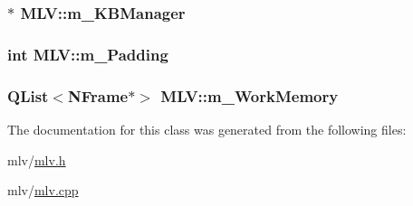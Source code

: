 \label{class_m_l_v_a735f5f98d1dcf3b835bfce6bb095334f}
\hypertarget{class_m_l_v_a658f6c57497493ea3002372ec8c1e87e}{
\subsubsection[{m\_\-KBManager}]{$\ast$ {\bf MLV::m\_\-KBManager}}}
\label{class_m_l_v_a658f6c57497493ea3002372ec8c1e87e}
\hypertarget{class_m_l_v_a5a16ccfba23723ec1006b15e8b2340ea}{
\subsubsection[{m\_\-Padding}]{\setlength{\rightskip}{0pt plus 5cm}int {\bf MLV::m\_\-Padding}}}
\label{class_m_l_v_a5a16ccfba23723ec1006b15e8b2340ea}
\hypertarget{class_m_l_v_a5ca2a3b69881b3627099e0b22434b42f}{
\subsubsection[{m\_\-WorkMemory}]{\setlength{\rightskip}{0pt plus 5cm}QList$<${\bf NFrame}$\ast$$>$ {\bf MLV::m\_\-WorkMemory}}}
\label{class_m_l_v_a5ca2a3b69881b3627099e0b22434b42f}


The documentation for this class was generated from the following files:\begin{DoxyCompactItemize}
\item 
mlv/\hyperlink{mlv_8h}{mlv.h}\item 
mlv/\hyperlink{mlv_8cpp}{mlv.cpp}\end{DoxyCompactItemize}
